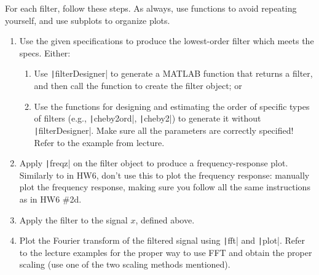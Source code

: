 \documentclass{article}
\begin{document}
For each filter, follow these steps. As always, use functions to avoid repeating yourself, and use subplots to organize plots.
\begin{enumerate}
\item Use the given specifications to produce the lowest-order filter which meets the specs. Either:
  \begin{enumerate}
  \item Use \texttt|filterDesigner| to generate a MATLAB function that returns a filter, and then call the function to create the filter object; or
  \item Use the functions for designing and estimating the order of specific types of filters (e.g., \texttt|cheby2ord|, \texttt|cheby2|) to generate it without \texttt|filterDesigner|. Make sure all the parameters are correctly specified! Refer to the example from lecture.
  \end{enumerate}
  
\item Apply \texttt|freqz| on the filter object to produce a frequency-response plot. Similarly to in HW6, don't use this to plot the frequency response: manually plot the frequency response, making sure you follow all the same instructions as in HW6 \#2d.
  
\item Apply the filter to the signal $x$, defined above.
  
\item Plot the Fourier transform of the filtered signal using \texttt|fft| and \texttt|plot|. Refer to the lecture examples for the proper way to use FFT and obtain the proper scaling (use one of the two scaling methods mentioned).
\end{enumerate}
\end{document}

